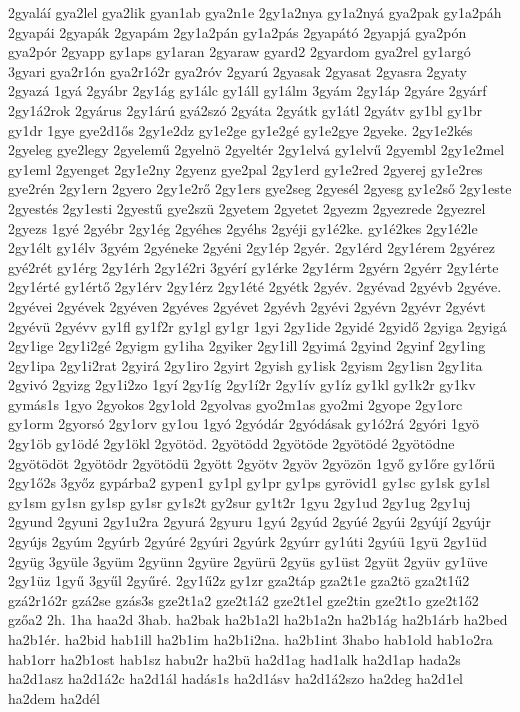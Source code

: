 {2gyaláí
gya2lel
gya2lik
gyan1ab
gya2n1e
2gy1a2nya
gy1a2nyá
gya2pak
gy1a2páh
2gyapái
2gyapák
2gyapám
2gy1a2pán
gy1a2pás
2gyapátó
2gyapjá
gya2pón
gya2pór
2gyapp
gy1aps
gy1aran
2gyaraw
gyard2
2gyardom
gya2rel
gy1argó
3gyari
gya2r1ón
gya2r1ó2r
gya2róv
2gyarú
2gyasak
2gyasat
2gyasra
2gyaty
2gyazá
1gyá
2gyábr
2gy1ág
gy1álc
gy1áll
gy1álm
3gyám
2gy1áp
2gyáre
2gyárf
2gy1á2rok
2gyárus
2gy1árú
gyá2szó
2gyáta
2gyátk
gy1átl
2gyátv
gy1bl
gy1br
gy1dr
1gye
gye2d1ős
2gy1e2dz
gy1e2ge
gy1e2gé
gy1e2gye
2gyeke.
2gy1e2kés
2gyeleg
gye2legy
2gyelemű
2gyelnö
2gyeltér
2gy1elvá
gy1elvű
2gyembl
2gy1e2mel
gy1eml
2gyenget
2gy1e2ny
2gyenz
gye2pal
2gy1erd
gy1e2red
2gyerej
gy1e2res
gye2rén
2gy1ern
2gyero
2gy1e2rő
2gy1ers
gye2seg
2gyesél
2gyesg
gy1e2ső
2gy1este
2gyestés
2gy1esti
2gyestű
gye2szü
2gyetem
2gyetet
2gyezm
2gyezrede
2gyezrel
2gyezs
1gyé
2gyébr
2gy1ég
2gyéhes
2gyéhs
2gyéji
gy1é2ke.
gy1é2kes
2gy1é2le
2gy1élt
gy1élv
3gyém
2gyéneke
2gyéni
2gy1ép
2gyér.
2gy1érd
2gy1érem
2gyérez
gyé2rét
gy1érg
2gy1érh
2gy1é2ri
3gyérí
gy1érke
2gy1érm
2gyérn
2gyérr
2gy1érte
2gy1érté
gy1értő
2gy1érv
2gy1érz
2gy1été
2gyétk
2gyév.
2gyévad
2gyévb
2gyéve.
2gyévei
2gyévek
2gyéven
2gyéves
2gyévet
2gyévh
2gyévi
2gyévn
2gyévr
2gyévt
2gyévü
2gyévv
gy1fl
gy1f2r
gy1gl
gy1gr
1gyi
2gy1ide
2gyidé
2gyidő
2gyiga
2gyigá
2gy1ige
2gy1i2gé
2gyigm
gy1iha
2gyiker
2gy1ill
2gyimá
2gyind
2gyinf
2gy1ing
2gy1ipa
2gy1i2rat
2gyirá
2gy1iro
2gyirt
2gyish
gy1isk
2gyism
2gy1isn
2gy1ita
2gyivó
2gyizg
2gy1i2zo
1gyí
2gy1íg
2gy1í2r
2gy1ív
gy1íz
gy1kl
gy1k2r
gy1kv
gymás1s
1gyo
2gyokos
2gy1old
2gyolvas
gyo2m1as
gyo2mi
2gyope
2gy1orc
gy1orm
2gyorsó
2gy1orv
gy1ou
1gyó
2gyódár
2gyódásak
gy1ó2rá
2gyóri
1gyö
2gy1öb
gy1ödé
2gy1ökl
2gyötöd.
2gyötödd
2gyötöde
2gyötödé
2gyötödne
2gyötödöt
2gyötödr
2gyötödü
2gyött
2gyötv
2gyöv
2gyözön
1győ
gy1őre
gy1őrü
2gy1ő2s
3győz
gypárba2
gypen1
gy1pl
gy1pr
gy1ps
gyrövid1
gy1sc
gy1sk
gy1sl
gy1sm
gy1sn
gy1sp
gy1sr
gy1s2t
gy2sur
gy1t2r
1gyu
2gy1ud
2gy1ug
2gy1uj
2gyund
2gyuni
2gy1u2ra
2gyurá
2gyuru
1gyú
2gyúd
2gyúé
2gyúi
2gyújí
2gyújr
2gyújs
2gyúm
2gyúrb
2gyúré
2gyúri
2gyúrk
2gyúrr
gy1úti
2gyúü
1gyü
2gy1üd
2gyüg
3gyüle
3gyüm
2gyünn
2gyüre
2gyürü
2gyüs
gy1üst
2gyüt
2gyüv
gy1üve
2gy1üz
1gyű
3gyűl
2gyűré.
2gy1ű2z
gy1zr
gza2táp
gza2t1e
gza2tö
gza2t1ű2
gzá2r1ó2r
gzá2se
gzás3s
gze2t1a2
gze2t1á2
gze2t1el
gze2tin
gze2t1o
gze2t1ő2
gzőa2
2h.
1ha
haa2d
3hab.
ha2bak
ha2b1a2l
ha2b1a2n
ha2b1ág
ha2b1árb
ha2bed
ha2b1ér.
ha2bid
hab1ill
ha2b1im
ha2b1i2na.
ha2b1int
3habo
hab1old
hab1o2ra
hab1orr
ha2b1ost
hab1sz
habu2r
ha2bü
ha2d1ag
had1alk
ha2d1ap
hada2s
ha2d1asz
ha2d1á2c
ha2d1ál
hadás1s
ha2d1ásv
ha2d1á2szo
ha2deg
ha2d1el
ha2dem
ha2dél
}
